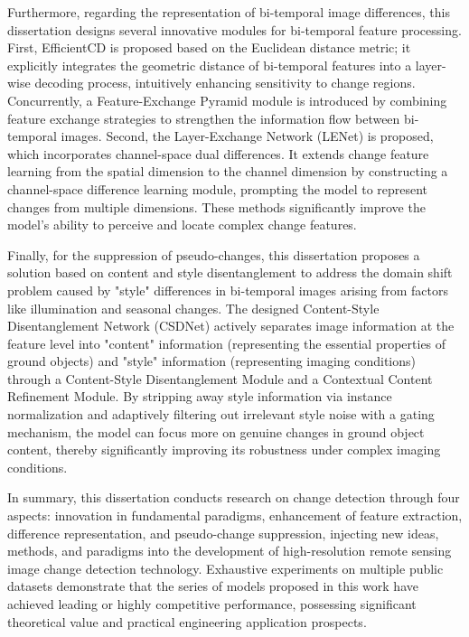 Furthermore, regarding the representation of bi-temporal image differences, this dissertation designs several innovative modules for bi-temporal feature processing. First, EfficientCD is proposed based on the Euclidean distance metric; it explicitly integrates the geometric distance of bi-temporal features into a layer-wise decoding process, intuitively enhancing sensitivity to change regions. Concurrently, a Feature-Exchange Pyramid module is introduced by combining feature exchange strategies to strengthen the information flow between bi-temporal images. Second, the Layer-Exchange Network (LENet) is proposed, which incorporates channel-space dual differences. It extends change feature learning from the spatial dimension to the channel dimension by constructing a channel-space difference learning module, prompting the model to represent changes from multiple dimensions. These methods significantly improve the model's ability to perceive and locate complex change features.

Finally, for the suppression of pseudo-changes, this dissertation proposes a solution based on content and style disentanglement to address the domain shift problem caused by "style" differences in bi-temporal images arising from factors like illumination and seasonal changes. The designed Content-Style Disentanglement Network (CSDNet) actively separates image information at the feature level into "content" information (representing the essential properties of ground objects) and "style" information (representing imaging conditions) through a Content-Style Disentanglement Module and a Contextual Content Refinement Module. By stripping away style information via instance normalization and adaptively filtering out irrelevant style noise with a gating mechanism, the model can focus more on genuine changes in ground object content, thereby significantly improving its robustness under complex imaging conditions.

In summary, this dissertation conducts research on change detection through four aspects: innovation in fundamental paradigms, enhancement of feature extraction, difference representation, and pseudo-change suppression, injecting new ideas, methods, and paradigms into the development of high-resolution remote sensing image change detection technology. Exhaustive experiments on multiple public datasets demonstrate that the series of models proposed in this work have achieved leading or highly competitive performance, possessing significant theoretical value and practical engineering application prospects.
